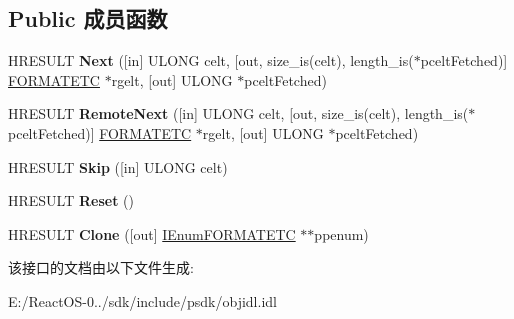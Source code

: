 \subsection*{Public 成员函数}
\begin{DoxyCompactItemize}
\item 
\mbox{\label{interface_i_enum_f_o_r_m_a_t_e_t_c_a4711c4e5aaff27761ace538dcd9b1ec7}} 
H\+R\+E\+S\+U\+LT {\bfseries Next} (\mbox{[}in\mbox{]} U\+L\+O\+NG celt, \mbox{[}out, size\+\_\+is(celt), length\+\_\+is($\ast$pcelt\+Fetched)\mbox{]} \hyperlink{struct_i_enum_f_o_r_m_a_t_e_t_c_1_1tag_f_o_r_m_a_t_e_t_c}{F\+O\+R\+M\+A\+T\+E\+TC} $\ast$rgelt, \mbox{[}out\mbox{]} U\+L\+O\+NG $\ast$pcelt\+Fetched)
\item 
\mbox{\label{interface_i_enum_f_o_r_m_a_t_e_t_c_ad309a94aa0632269ae7043a9027cd9d2}} 
H\+R\+E\+S\+U\+LT {\bfseries Remote\+Next} (\mbox{[}in\mbox{]} U\+L\+O\+NG celt, \mbox{[}out, size\+\_\+is(celt), length\+\_\+is($\ast$pcelt\+Fetched)\mbox{]} \hyperlink{struct_i_enum_f_o_r_m_a_t_e_t_c_1_1tag_f_o_r_m_a_t_e_t_c}{F\+O\+R\+M\+A\+T\+E\+TC} $\ast$rgelt, \mbox{[}out\mbox{]} U\+L\+O\+NG $\ast$pcelt\+Fetched)
\item 
\mbox{\label{interface_i_enum_f_o_r_m_a_t_e_t_c_aab62d5dc612b6a154a6940be7aa22827}} 
H\+R\+E\+S\+U\+LT {\bfseries Skip} (\mbox{[}in\mbox{]} U\+L\+O\+NG celt)
\item 
\mbox{\label{interface_i_enum_f_o_r_m_a_t_e_t_c_a0e8a16c683ec8e0ea8338847a7e89099}} 
H\+R\+E\+S\+U\+LT {\bfseries Reset} ()
\item 
\mbox{\label{interface_i_enum_f_o_r_m_a_t_e_t_c_a1e8940b49013fbaf1c1c77708a643339}} 
H\+R\+E\+S\+U\+LT {\bfseries Clone} (\mbox{[}out\mbox{]} \hyperlink{interface_i_enum_f_o_r_m_a_t_e_t_c}{I\+Enum\+F\+O\+R\+M\+A\+T\+E\+TC} $\ast$$\ast$ppenum)
\end{DoxyCompactItemize}


该接口的文档由以下文件生成\+:\begin{DoxyCompactItemize}
\item 
E\+:/\+React\+O\+S-\/0../sdk/include/psdk/objidl.\+idl\end{DoxyCompactItemize}
